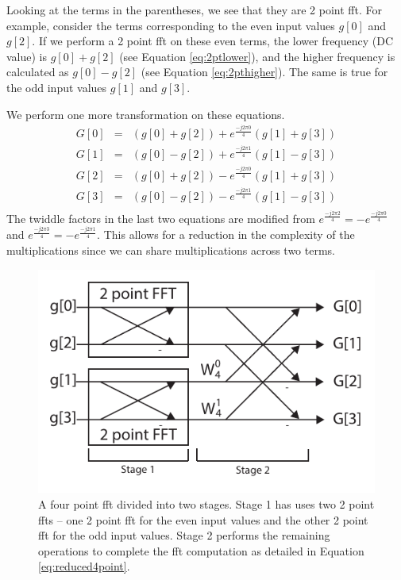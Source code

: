 Looking at the terms in the parentheses, we see that they are 2 point \gls{fft}. For example, consider the terms corresponding to the even input values $g[0]$ and $g[2]$. If we perform a 2 point \gls{fft} on these even terms, the lower frequency (DC value) is $g[0] + g[2]$ (see Equation \ref{eq:2ptlower}), and the higher frequency is calculated as $g[0] - g[2]$ (see Equation \ref{eq:2pthigher}). The same is true for the odd input values $g[1]$ and $g[3]$. 

We perform one more transformation on these equations.
\begin{equation}
\begin{array} {lll} 
G[0] & = & (g[0] + g[2]) + e^{\frac{-j 2 \pi 0}{4}} (g[1] + g[3])\\
G[1] & = & (g[0] - g[2]) + e^{\frac{-j 2 \pi 1}{4}} (g[1] - g[3])\\
G[2] & = & (g[0] + g[2]) - e^{\frac{-j 2 \pi 0}{4}} (g[1] + g[3])\\
G[3] & = & (g[0] - g[2]) - e^{\frac{-j 2 \pi 1}{4}} (g[1] - g[3])\\
\end{array}
\label{eq:reduced4point}
\end{equation}
The twiddle factors in the last two equations are modified from $e^{\frac{-j 2 \pi 2}{4}} = -e^{\frac{-j 2 \pi 0}{4}}$ and $e^{\frac{-j 2 \pi 3}{4}} = -e^{\frac{-j 2 \pi 1}{4}}$. This allows for a reduction in the complexity of the multiplications since we can share multiplications across two terms. 

\begin{figure}
\centering
\includegraphics[width=  .5 \textwidth]{images/4ptFFT}
\caption{A four point \gls{fft} divided into two stages. Stage 1 has uses two 2 point \gls{fft}s -- one 2 point \gls{fft} for the even input values and the other 2 point \gls{fft} for the odd input values. Stage 2 performs the remaining operations to complete the \gls{fft} computation as detailed in Equation \ref{eq:reduced4point}. }
\label{fig:4ptFFT}
\end{figure}

